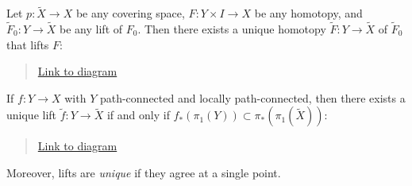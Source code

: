 \begin{theorem}

Let \(p:\tilde X \to X\) be any covering space, \(F: Y \times I \to X\)
be any homotopy, and \(\tilde F_0: Y\to \tilde X\) be any lift of
\(F_0\). Then there exists a unique homotopy \(\tilde F:Y\to \tilde X\)
of \(\tilde F_0\) that lifts \(F\):

\begin{center}
\end{center}

\begin{quote}
\href{https://q.uiver.app/?q=WzAsNCxbMiwwLCJcXHRpbGRlIFgiXSxbMiwyLCJYIl0sWzAsMiwiWVxcY3Jvc3MgSSJdLFswLDAsIlkiXSxbMCwxLCJwIl0sWzIsMSwiRiIsMl0sWzMsMCwiXFx0aWxkZSBGXzAiXSxbMiwwLCJcXGV4aXN0cyBcXHRpbGRlIEYiLDAseyJzdHlsZSI6eyJib2R5Ijp7Im5hbWUiOiJkYXNoZWQifX19XSxbMywyLCJ5IFxcbWFwc3RvICh5LCAwKSIsMix7InN0eWxlIjp7InRhaWwiOnsibmFtZSI6Imhvb2siLCJzaWRlIjoidG9wIn19fV1d}{Link
to diagram}
\end{quote}

\end{theorem}

\begin{theorem}

If \(f: Y\to X\) with \(Y\) path-connected and locally path-connected,
then there exists a unique lift \(\tilde f: Y\to \tilde X\) if and only
if \(f_*(\pi_1(Y)) \subset \pi_*(\pi_1 (\tilde X))\):

\begin{center}
\end{center}

\begin{quote}
\href{https://q.uiver.app/?q=WzAsMyxbMCwyLCJZIl0sWzIsMiwiWCJdLFsyLDAsIlxcdGlsZGUgWCJdLFsyLDEsInAiXSxbMCwxLCJmIiwyXSxbMCwyLCJcXHRpbGRlIGYiLDAseyJzdHlsZSI6eyJib2R5Ijp7Im5hbWUiOiJkYXNoZWQifX19XV0=}{Link
to diagram}
\end{quote}

Moreover, lifts are \emph{unique} if they agree at a single point.

\end{theorem}

